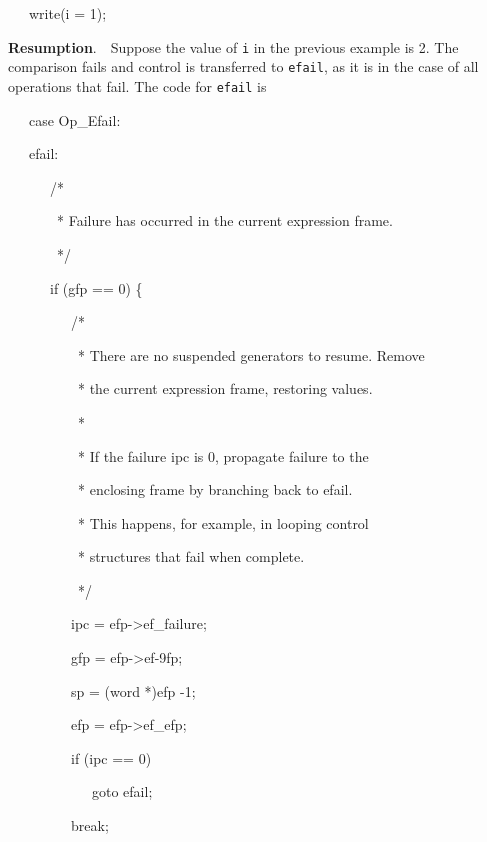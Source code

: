 {\ttfamily\mdseries
\ \ \ write(i = 1);}


\textbf{Resumption}.\ \ Suppose the value of \texttt{i} in the
previous example is 2. The comparison fails and control is transferred
to \texttt{efail}, as it is in the case of all operations that
fail. The code for \texttt{efail} is

{\ttfamily\mdseries
\ \ \ case Op\_Efail:}

{\ttfamily\mdseries
\ \ \ efail:}

{\ttfamily\mdseries
\ \ \ \ \ \ /*}

{\ttfamily\mdseries
\ \ \ \ \ \ \ * Failure has occurred in the current expression frame.}

{\ttfamily\mdseries
\ \ \ \ \ \ \ */}

{\ttfamily\mdseries
\ \ \ \ \ \ if (gfp == 0) \{}

{\ttfamily\mdseries
\ \ \ \ \ \ \ \ \ /*}

{\ttfamily\mdseries
\ \ \ \ \ \ \ \ \ \ * There are no suspended generators to resume. Remove}

{\ttfamily\mdseries
\ \ \ \ \ \ \ \ \ \ * the current expression frame, restoring values.}

{\ttfamily\mdseries
\ \ \ \ \ \ \ \ \ \ *}

{\ttfamily\mdseries
\ \ \ \ \ \ \ \ \ \ * If the failure ipc is 0, propagate failure to the}

{\ttfamily\mdseries
\ \ \ \ \ \ \ \ \ \ * enclosing frame by branching back to efail.}

{\ttfamily\mdseries
\ \ \ \ \ \ \ \ \ \ * This happens, for example, in looping control}

{\ttfamily\mdseries
\ \ \ \ \ \ \ \ \ \ * structures that fail when complete.}

{\ttfamily\mdseries
\ \ \ \ \ \ \ \ \ \ */}

{\ttfamily\mdseries
\ \ \ \ \ \ \ \ \ ipc = efp-{\textgreater}ef\_failure;}

{\ttfamily\mdseries
\ \ \ \ \ \ \ \ \ gfp = efp-{\textgreater}ef-9fp;}

{\ttfamily\mdseries
\ \ \ \ \ \ \ \ \ sp = (word *)efp -1;}

{\ttfamily\mdseries
\ \ \ \ \ \ \ \ \ efp = efp-{\textgreater}ef\_efp;}

{\ttfamily\mdseries
\ \ \ \ \ \ \ \ \ if (ipc == 0)}

{\ttfamily\mdseries
\ \ \ \ \ \ \ \ \ \ \ \ goto efail;}

{\ttfamily\mdseries
\ \ \ \ \ \ \ \ \ break;}

